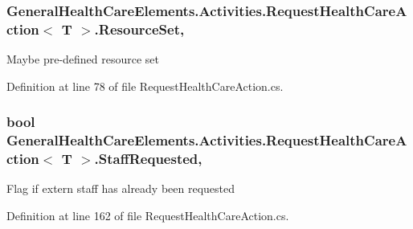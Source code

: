 \subsubsection[{\texorpdfstring{Resource\+Set}{ResourceSet}}]{ {\bf General\+Health\+Care\+Elements.\+Activities.\+Request\+Health\+Care\+Action}$<$ T $>$.{\bf Resource\+Set}\hspace{0.3cm}{\ttfamily [get]}, {\ttfamily [set]}}\hypertarget{class_general_health_care_elements_1_1_activities_1_1_request_health_care_action_a20639ff4451f5f416631615e442d088d}{}\label{class_general_health_care_elements_1_1_activities_1_1_request_health_care_action_a20639ff4451f5f416631615e442d088d}


Maybe pre-\/defined resource set 



Definition at line 78 of file Request\+Health\+Care\+Action.\+cs.

\subsubsection[{\texorpdfstring{Staff\+Requested}{StaffRequested}}]{\setlength{\rightskip}{0pt plus 5cm}bool {\bf General\+Health\+Care\+Elements.\+Activities.\+Request\+Health\+Care\+Action}$<$ T $>$.Staff\+Requested\hspace{0.3cm}{\ttfamily [get]}, {\ttfamily [set]}}\hypertarget{class_general_health_care_elements_1_1_activities_1_1_request_health_care_action_a596591434caa3c00595cd8dc6440c919}{}\label{class_general_health_care_elements_1_1_activities_1_1_request_health_care_action_a596591434caa3c00595cd8dc6440c919}


Flag if extern staff has already been requested 



Definition at line 162 of file Request\+Health\+Care\+Action.\+cs.

